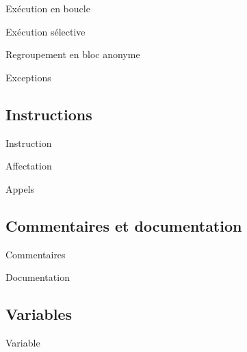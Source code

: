 \documentclass{beamer}
\begin{document}
\begin{frame}{Exécution en boucle} %

\end{frame}

\begin{frame}{Exécution sélective} %

\end{frame}

\begin{frame}{Regroupement en bloc anonyme} %

\end{frame}

\begin{frame}{Exceptions} %

\end{frame}

\subsection{Instructions}

\begin{frame}{Instruction}

\end{frame}

\begin{frame}{Affectation}

\end{frame}

\begin{frame}{Appels}

\end{frame}

\subsection{Commentaires et documentation}

\begin{frame}{Commentaires}

\end{frame}

\begin{frame}{Documentation}

\end{frame}

\subsection{Variables}

\begin{frame}{Variable}

\end{frame}
\end{document}
